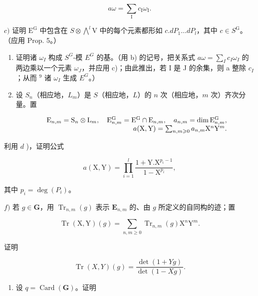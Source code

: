 \[
a \omega = \sum_ {\mathrm{I}} c _ {\mathrm{I}} \omega_ {\mathrm{I}}.
\]

\(c)\) 证明 \(\mathrm{E}^{\mathrm{G}}\) 中包含在 \(S\otimes \bigwedge^{l}\mathrm{V}\) 中的每个元素都形如 \(c.dP_{1}\ldots dP_{l}\)，其中 \(c\in S^{\mathrm{G}}\)。（应用 Prop. 5。）

\begin{enumerate}
\def\labelenumi{\alph{enumi})}
\setcounter{enumi}{3}
\item
  证明诸 \(\omega_{I}\) 构成 \(S^{G}\)-模 \(E^{G}\) 的基。（用 b) 的记号，把关系式 \(a\omega = \sum_{I} c_{I}\omega_{I}\) 的两边乘以一个元素 \(\omega_{J}\)，并应用 c)；由此推出，若 I 是 J 的余集，则 a 整除 \(c_{I}\)；从而 \(^{9}\) 诸 \(\omega_{I}\) 生成 \(E^{G}\)。）
\item
  设 \(S_{n}\)（相应地，\(L_{m}\)）是 \(S\)（相应地，\(L\)）的 \(n\) 次（相应地，\(m\) 次）齐次分量。置
\end{enumerate}

\[
\begin{array}{r l r} & & {\mathrm{E} _ {n, m} = \mathrm{S} _ {n} \otimes \mathrm{L} _ {m}, \quad \mathrm{E} _ {n, m} ^ {\mathrm{G}} = \mathrm{E} ^ {\mathrm{G}} \cap \mathrm{E} _ {n, m}, \quad a _ {n, m} = \dim \mathrm{E} _ {n, m} ^ {\mathrm{G}},} \\ & & {a (\mathrm{X}, \mathrm{Y}) = \sum_ {n, m \geqslant 0} a _ {n, m} \mathrm{X} ^ {n} \mathrm{Y} ^ {m}.} \end{array}
\]

利用 \(d\) )，证明公式

\[
a (\mathrm{X}, \mathrm{Y}) = \prod_ {i = 1} ^ {l} \frac {1 + \mathrm{Y} . \mathrm{X} ^ {p _ {i} - 1}}{1 - \mathrm{X} ^ {p _ {i}}},
\]

其中 \(p_{i} = \deg(P_{i})\)。

\(f)\) 若 \(g \in \mathbf{G}\)，用 \(\operatorname{Tr}_{n,m}(g)\) 表示 \(\mathbf{E}_{n,m}\) 的、由 \(g\) 所定义的自同构的迹；置

\[
\operatorname{Tr} (\mathrm{X}, \mathrm{Y}) (g) = \sum_ {n, m \geqslant 0} \operatorname{Tr} _ {n, m} (g) \mathrm{X} ^ {n} \mathrm{Y} ^ {m}.
\]

证明

\[
\operatorname{Tr} (X, Y) (g) = \frac {\det (1 + Y g)}{\det (1 - X g)}.
\]

\begin{enumerate}
\def\labelenumi{\alph{enumi})}
\setcounter{enumi}{6}
\tightlist
\item
  设 \(q = \operatorname{Card}(\mathbf{G})\)。证明
\end{enumerate}

